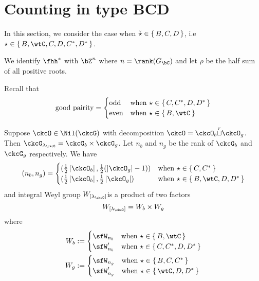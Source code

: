 \documentclass[12pt,a4paper]{amsart}
\def\abs#1{\left|{#1}\right|}
\numberwithin{equation}{section}
\theoremstyle{remark}
\def\half{{\tfrac{1}{2}}}
\def\lamck{\lambda_\ckcO}
\def\Gc{G_\bC}
\def\WLamck{W_{[\lambda_{\ckcO}]}}
\def\cuprow{{\stackrel{r}{\sqcup}}}
\def\ckstar{{\check \star}}
\begin{document}
\section{Counting in type BCD}

In this section, we consider the case when $\ckstar \in \set{B,C,D}$, i.e
$\star \in \set{B,\wtC, C,D,C^{*}, D^{*}}$.

We identify $\fhh^{*}$ with $\bZ^{n}$ where $n = \rank(\Gc)$
and let $\rho$ be the half sum of all positive roots.

Recall that
\[
  \text{good pairity} =
\begin{cases}
 \text{odd} & \text{when } \star \in \set{C,C^{*},D,D^{*}}\\
 \text{even} & \text{when } \star \in \set{B,\wtC}\\
\end{cases}
\]

\def\Wb{W_{b}}
\def\Wg{W_{g}}

  Suppose $\ckcO\in \Nil(\ckcG)$ with decomposition
  $\ckcO = \ckcO_{b}\cuprow \ckcO_{g}$.
  Then $\ckcG_{\lamck} = \ckcG_{b}\times \ckcG_{g}$.
  Let $n_{b}$ and $n_{g}$ be the rank of $\ckcG_{b}$ and $\ckcG_{g}$
  respectively. We have
  \[
    (n_{b}, n_{g}) =
    \begin{cases}
      (\half \abs{\ckcO_{b}}, \half(\abs{\ckcO_{g}}-1)) & \text{when
      } \star \in \set{C,C^{*}}\\
      (\half \abs{\ckcO_{b}}, \half\abs{\ckcO_{g}}) & \text{when
      } \star \in \set{B,\wtC,D,D^{*}}\\
    \end{cases}
  \]
  and integral Weyl group $\WLamck$is a product of two factors
  \[
    W_{[\lamck]} =\Wb\times \Wg
  \]
  where
  \[
    \begin{split}
    \Wb & := \begin{cases}
      \sfW_{n_{b}}  & \text{when } \star \in \set{B, \wtC} \\
      \sfW'_{n_{b}} & \text{when } \star \in \set{C,C^{*},D,D^{*}}
      \end{cases}\\
    \Wg & := \begin{cases}
      \sfW_{n_{g}}  & \text{when } \star \in \set{B,C, C^{*} } \\
      \sfW'_{n_{g}} & \text{when } \star \in \set{\wtC,D,D^{*}}
      \end{cases}
    \end{split}
  \]
\end{document}
